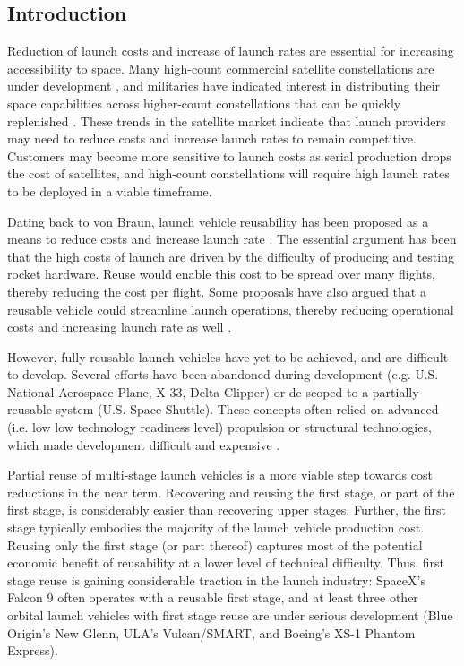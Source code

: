 \documentclass[conf]{new-aiaa}
\begin{document}
\begin{multicols}{2}

\section{Introduction}

Reduction of launch costs and increase of launch rates are essential for increasing accessibility to space. Many high-count commercial satellite constellations are under development \cite{SIA2017, Henry2017}, and militaries have indicated interest in distributing their space capabilities across higher-count constellations that can be quickly replenished \cite{DARPA_Blackjack}. These trends in the satellite market indicate that launch providers may need to reduce costs and increase launch rates to remain competitive. Customers may become more sensitive to launch costs as serial production drops the cost of satellites, and high-count constellations will require high launch rates to be deployed in a viable timeframe.

Dating back to von Braun, launch vehicle reusability has been proposed as a means to reduce costs and increase launch rate \cite{vonBraun52}. The essential argument has been that the high costs of launch are driven by the difficulty of producing and testing rocket hardware. Reuse would enable this cost to be spread over many flights, thereby reducing the cost per flight. Some proposals have also argued that a reusable vehicle could streamline launch operations, thereby reducing operational costs and increasing launch rate as well \cite{Butrica03}.

However, fully reusable launch vehicles have yet to be achieved, and are difficult to develop. Several efforts have been abandoned during development (e.g. U.S. National Aerospace Plane, X-33, Delta Clipper) or de-scoped to a partially reusable system (U.S. Space Shuttle). These concepts often relied on advanced (i.e. low low technology readiness level) propulsion or structural technologies, which made development difficult and expensive \cite{Butrica03}.

Partial reuse of multi-stage launch vehicles is a more viable step towards cost reductions in the near term. Recovering and reusing the first stage, or part of the first stage, is considerably easier than recovering upper stages. Further, the first stage typically embodies the majority of the launch vehicle production cost. Reusing only the first stage (or part thereof) captures most of the potential economic benefit of reusability at a lower level of technical difficulty. Thus, first stage reuse is gaining considerable traction in the launch industry: SpaceX's Falcon 9 often operates with a reusable first stage, and at least three other orbital launch vehicles with first stage reuse are under serious development (Blue Origin's New Glenn, ULA's Vulcan/SMART, and Boeing's XS-1 Phantom Express).


\end{multicols}
\end{document}

